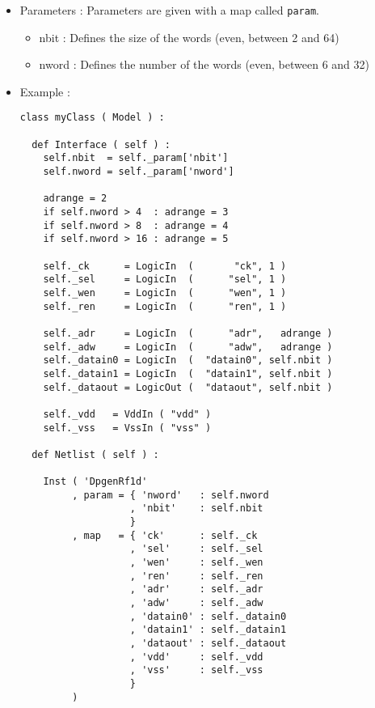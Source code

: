 \begin{itemize}
    \item Parameters : Parameters are given with a map called \verb-param-.
    \begin{itemize}
        \item nbit : Defines the size of the words  (even, between 2 and 64)
        \item nword : Defines the number of the words (even, between 6 and 32)
    \end{itemize}
    \item Example :
\begin{verbatim}
class myClass ( Model ) :
    
  def Interface ( self ) :
    self.nbit  = self._param['nbit']
    self.nword = self._param['nword']
      
    adrange = 2
    if self.nword > 4  : adrange = 3
    if self.nword > 8  : adrange = 4
    if self.nword > 16 : adrange = 5
    
    self._ck      = LogicIn  (       "ck", 1 )
    self._sel     = LogicIn  (      "sel", 1 )
    self._wen     = LogicIn  (      "wen", 1 )
    self._ren     = LogicIn  (      "ren", 1 )
                   
    self._adr     = LogicIn  (      "adr",   adrange )
    self._adw     = LogicIn  (      "adw",   adrange )
    self._datain0 = LogicIn  (  "datain0", self.nbit )
    self._datain1 = LogicIn  (  "datain1", self.nbit )
    self._dataout = LogicOut (  "dataout", self.nbit )
      
    self._vdd   = VddIn ( "vdd" )
    self._vss   = VssIn ( "vss" )
    
  def Netlist ( self ) :
      
    Inst ( 'DpgenRf1d'
         , param = { 'nword'   : self.nword
                   , 'nbit'    : self.nbit
                   }
         , map   = { 'ck'      : self._ck
                   , 'sel'     : self._sel
                   , 'wen'     : self._wen
                   , 'ren'     : self._ren
                   , 'adr'     : self._adr
                   , 'adw'     : self._adw
                   , 'datain0' : self._datain0
                   , 'datain1' : self._datain1
                   , 'dataout' : self._dataout
                   , 'vdd'     : self._vdd
                   , 'vss'     : self._vss
                   }
         )  
\end{verbatim}
\end{itemize}
